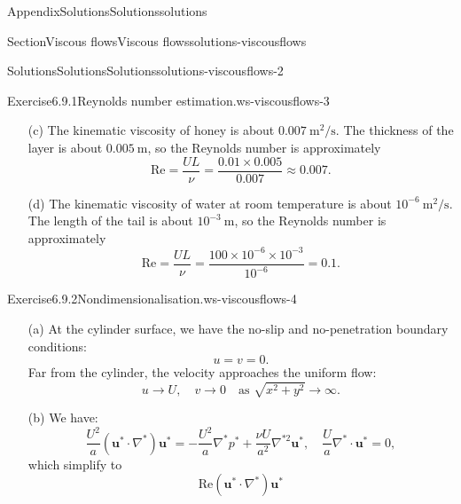 \documentclass[oneside,10pt,]{book}
\numberwithin{equation}{section}
\newcommand{\bu}{\boldsymbol{u}}
\begin{document}
\begin{appendixptx}{Appendix}{Solutions}{}{Solutions}{}{}{solutions}
\begin{sectionptx}{Section}{Viscous flows}{}{Viscous flows}{}{}{solutions-viscousflows}
\begin{solutions-subsection-numberless}{Solutions}{Solutions}{}{Solutions}{}{}{solutions-viscousflows-2}
\begin{divisionsolution}{Exercise}{6.9.1}{Reynolds number estimation.}{ws-viscousflows-3}
\begin{enumerate}[font=\bfseries,label=(\alph*),ref=\alph*]
\begin{equation*}
\textrm{Re}=\frac{UL}{\nu}
=\frac{0.3\times0.02}{2.4\times10^{-6}}
=2500.
\end{equation*}
Although this is above 2000, blood flow in arteries is typically laminar.%
\item[(c)]\noindent\hypertarget{ws-viscousflows-3-5-2-main}{}The kinematic viscosity of honey is about \(0.007~\textrm{m}^2/\textrm{s}\). The thickness of the layer is about \(0.005~\textrm{m}\), so the Reynolds number is approximately%
\begin{equation*}
\textrm{Re}=\frac{UL}{\nu}
=\frac{0.01\times0.005}{0.007}
\approx0.007.
\end{equation*}
%
\item[(d)]\noindent\hypertarget{ws-viscousflows-3-6-2-main}{}The kinematic viscosity of water at room temperature is about \(10^{-6}~\textrm{m}^2/\textrm{s}\). The length of the tail is about \(10^{-3}~\textrm{m}\), so the Reynolds number is approximately%
\begin{equation*}
\textrm{Re}=\frac{UL}{\nu}
=\frac{100\times10^{-6}\times10^{-3}}{10^{-6}}
=0.1.
\end{equation*}
%
\end{enumerate}%
\end{divisionsolution}%
\begin{divisionsolution}{Exercise}{6.9.2}{Nondimensionalisation.}{ws-viscousflows-4}%
\begin{enumerate}[font=\bfseries,label=(\alph*),ref=\alph*]%
\item[(a)]\noindent\hypertarget{ws-viscousflows-4-3-2-main}{}At the cylinder surface, we have the no-slip and no-penetration boundary conditions:%
\begin{equation*}
u=v=0.
\end{equation*}
Far from the cylinder, the velocity approaches the uniform flow:%
\begin{equation*}
u\rightarrow U,\quad v\rightarrow0\quad\textrm{as }\sqrt{x^2+y^2}\rightarrow\infty.
\end{equation*}
%
\item[(b)]\noindent\hypertarget{ws-viscousflows-4-4-2-main}{}We have:%
\begin{equation*}
\frac{U^2}{a}\left(\bu^*\cdot\nabla^*\right)\bu^*
=-\frac{U^2}{a}\nabla^*p^*
+\frac{\nu U}{a^2}\nabla^{*2}\bu^*,\quad
\frac{U}{a}\nabla^*\cdot\bu^*=0,
\end{equation*}
which simplify to%
\begin{equation*}
\mathrm{Re}\left(\bu^*\cdot\nabla^*\right)\bu^*

\end{equation*}
\end{enumerate}
\end{divisionsolution}
\end{solutions-subsection-numberless}
\end{sectionptx}
\end{appendixptx}
\end{document}
